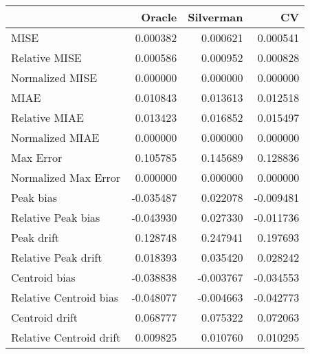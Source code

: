 \begin{tabular}{lrrr}
  \hline
 & Oracle & Silverman & CV \\ 
  \hline
MISE & 0.000382 & 0.000621 & 0.000541 \\ 
  Relative MISE & 0.000586 & 0.000952 & 0.000828 \\ 
  Normalized MISE & 0.000000 & 0.000000 & 0.000000 \\ 
  MIAE & 0.010843 & 0.013613 & 0.012518 \\ 
  Relative MIAE & 0.013423 & 0.016852 & 0.015497 \\ 
  Normalized MIAE & 0.000000 & 0.000000 & 0.000000 \\ 
  Max Error & 0.105785 & 0.145689 & 0.128836 \\ 
  Normalized Max Error & 0.000000 & 0.000000 & 0.000000 \\ 
  Peak bias & -0.035487 & 0.022078 & -0.009481 \\ 
  Relative Peak bias & -0.043930 & 0.027330 & -0.011736 \\ 
  Peak drift & 0.128748 & 0.247941 & 0.197693 \\ 
  Relative Peak drift & 0.018393 & 0.035420 & 0.028242 \\ 
  Centroid bias & -0.038838 & -0.003767 & -0.034553 \\ 
  Relative Centroid bias & -0.048077 & -0.004663 & -0.042773 \\ 
  Centroid drift & 0.068777 & 0.075322 & 0.072063 \\ 
  Relative Centroid drift & 0.009825 & 0.010760 & 0.010295 \\ 
   \hline
\end{tabular}
